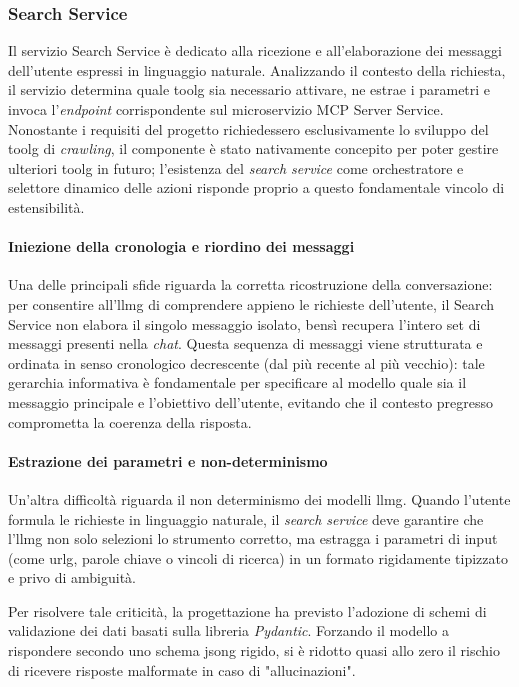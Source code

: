 \subsubsection{Search Service}
Il servizio Search Service è dedicato alla ricezione e 
all'elaborazione dei messaggi dell'utente espressi in linguaggio naturale. 
Analizzando il contesto della richiesta, il servizio determina quale 
\gls{toolg} sia necessario attivare, ne estrae i parametri 
e invoca l'\textit{endpoint} corrispondente sul microservizio 
MCP Server Service. 
Nonostante i requisiti del progetto richiedessero esclusivamente lo 
sviluppo del \gls{toolg} di \textit{crawling}, il componente 
è stato nativamente concepito per poter gestire ulteriori 
\gls{toolg} in futuro; l'esistenza del \textit{search service} 
come orchestratore e selettore dinamico delle azioni risponde proprio 
a questo fondamentale vincolo di estensibilità.

\paragraph{Iniezione della cronologia e riordino dei messaggi}
Una delle principali sfide riguarda la corretta ricostruzione della conversazione: 
per consentire all'\gls{llmg} di comprendere appieno le richieste dell'utente, 
il Search Service non elabora il singolo messaggio isolato, bensì recupera 
l'intero set di messaggi presenti nella \textit{chat}. 
Questa sequenza di messaggi viene strutturata e ordinata in senso cronologico 
decrescente (dal più recente al più vecchio): tale gerarchia informativa è 
fondamentale per specificare al modello quale sia il messaggio principale
e l'obiettivo dell'utente, evitando che il contesto pregresso comprometta 
la coerenza della risposta.

\paragraph{Estrazione dei parametri e non-determinismo}
Un'altra difficoltà riguarda il non determinismo dei modelli \gls{llmg}. 
Quando l'utente formula le richieste in linguaggio naturale, 
il \textit{search service} deve garantire che l'\gls{llmg} non solo selezioni 
lo strumento corretto, ma estragga i parametri di input (come \gls{urlg}, parole 
chiave o vincoli di ricerca) in un formato rigidamente tipizzato e privo di ambiguità.

Per risolvere tale criticità, la progettazione ha previsto l'adozione di schemi di 
validazione dei dati basati sulla libreria \textit{Pydantic}. 
Forzando il modello a rispondere secondo uno schema \gls{jsong} rigido, 
si è ridotto quasi allo zero il rischio di ricevere risposte malformate in 
caso di "allucinazioni".

